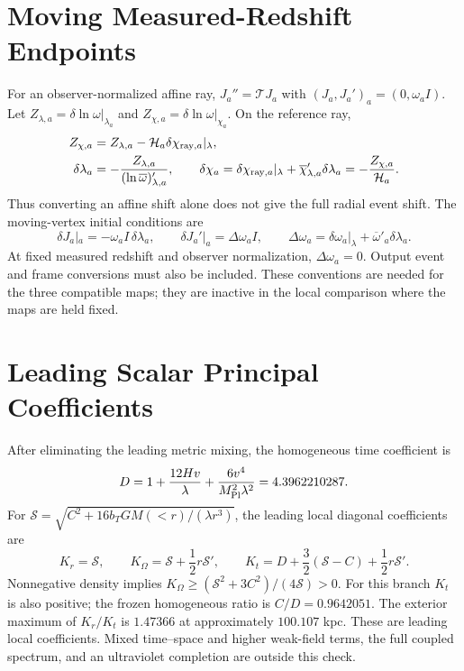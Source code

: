 \section{Moving Measured-Redshift Endpoints}
\label{app:endpoints}
For an observer-normalized affine ray,
$J_a''=\mathcal T J_a$ with
$(J_a,J_a')_a=(0,\omega_a I)$.
Let $Z_{\lambda,a}=\delta\ln\omega|_{\lambda_a}$ and
$Z_{\chi,a}=\delta\ln\omega|_{\chi_a}$. On the reference ray,
\begin{align}
 Z_{\chi,a}&=Z_{\lambda,a}
 -\mathcal H_a\delta\chi_{{\rm ray},a}|_\lambda,\nonumber\\
 \delta\lambda_a&=-\frac{Z_{\lambda,a}}
 {(\ln\overline\omega)'_{\lambda,a}},\qquad
 \delta\chi_a=\delta\chi_{{\rm ray},a}|_\lambda
 +\overline\chi'_{\lambda,a}\delta\lambda_a
 =-\frac{Z_{\chi,a}}{\mathcal H_a}.
\end{align}
Thus converting an affine shift alone does not give the full radial
event shift. The moving-vertex initial conditions are
\begin{equation}
 \delta J_a|_a=-\omega_aI\,\delta\lambda_a,\qquad
 \delta J_a'|_a=\Delta\omega_a I,\qquad
 \Delta\omega_a=\delta\omega_a|_\lambda+
 \overline\omega'_a\delta\lambda_a .
\end{equation}
At fixed measured redshift and observer normalization,
$\Delta\omega_a=0$. Output event and frame conversions must also be
included. These conventions are needed for the three compatible maps;
they are inactive in the local comparison where the maps are held fixed.

\section{Leading Scalar Principal Coefficients}
\label{app:principal}
After eliminating the leading metric mixing, the homogeneous time
coefficient is
\begin{equation}
 D=1+\frac{12Hv}{\lambda}
 +\frac{6v^4}{M_{\rm Pl}^2\lambda^2}=4.3962210287 .
\end{equation}
For
$\mathcal S=\sqrt{C^2+16b_TGM(<r)/(\lambda r^3)}$,
the leading local diagonal coefficients are
\begin{equation}
 K_r=\mathcal S,\qquad
 K_\Omega=\mathcal S+\frac12r\mathcal S',\qquad
 K_t=D+\frac32(\mathcal S-C)+\frac12r\mathcal S'.
\end{equation}
Nonnegative density implies
$K_\Omega\ge(\mathcal S^2+3C^2)/(4\mathcal S)>0$.
For this branch $K_t$ is also positive; the frozen homogeneous
ratio is $C/D=0.9642051$. The exterior maximum of $K_r/K_t$
is $1.47366$ at approximately $100.107$ kpc.
These are leading local coefficients. Mixed time--space and
higher weak-field terms, the full coupled spectrum, and an ultraviolet
completion are outside this check.
